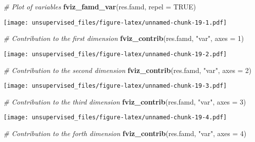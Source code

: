 \documentclass[
]{article}
\newenvironment{Shaded}{\begin{snugshade}}{\end{snugshade}}
\newcommand{\CommentTok}[1]{\textcolor[rgb]{0.56,0.35,0.01}{\textit{#1}}}
\newcommand{\DataTypeTok}[1]{\textcolor[rgb]{0.13,0.29,0.53}{#1}}
\newcommand{\DecValTok}[1]{\textcolor[rgb]{0.00,0.00,0.81}{#1}}
\newcommand{\KeywordTok}[1]{\textcolor[rgb]{0.13,0.29,0.53}{\textbf{#1}}}
\newcommand{\NormalTok}[1]{#1}
\newcommand{\OtherTok}[1]{\textcolor[rgb]{0.56,0.35,0.01}{#1}}
\newcommand{\StringTok}[1]{\textcolor[rgb]{0.31,0.60,0.02}{#1}}
\begin{document}
\begin{Shaded}
\begin{Highlighting}[]
\CommentTok{# Plot of variables}
\KeywordTok{fviz_famd_var}\NormalTok{(res.famd, }\DataTypeTok{repel =} \OtherTok{TRUE}\NormalTok{)}
\end{Highlighting}
\end{Shaded}

\texttt{[image: unsupervised\_files/figure-latex/unnamed-chunk-19-1.pdf]}

\begin{Shaded}
\begin{Highlighting}[]
\CommentTok{# Contribution to the first dimension}
\KeywordTok{fviz_contrib}\NormalTok{(res.famd, }\StringTok{"var"}\NormalTok{, }\DataTypeTok{axes =} \DecValTok{1}\NormalTok{)}
\end{Highlighting}
\end{Shaded}

\texttt{[image: unsupervised\_files/figure-latex/unnamed-chunk-19-2.pdf]}

\begin{Shaded}
\begin{Highlighting}[]
\CommentTok{# Contribution to the second dimension}
\KeywordTok{fviz_contrib}\NormalTok{(res.famd, }\StringTok{"var"}\NormalTok{, }\DataTypeTok{axes =} \DecValTok{2}\NormalTok{)}
\end{Highlighting}
\end{Shaded}

\texttt{[image: unsupervised\_files/figure-latex/unnamed-chunk-19-3.pdf]}

\begin{Shaded}
\begin{Highlighting}[]
\CommentTok{# Contribution to the third dimension}
\KeywordTok{fviz_contrib}\NormalTok{(res.famd, }\StringTok{"var"}\NormalTok{, }\DataTypeTok{axes =} \DecValTok{3}\NormalTok{)}
\end{Highlighting}
\end{Shaded}

\texttt{[image: unsupervised\_files/figure-latex/unnamed-chunk-19-4.pdf]}

\begin{Shaded}
\begin{Highlighting}[]
\CommentTok{# Contribution to the forth dimension}
\KeywordTok{fviz_contrib}\NormalTok{(res.famd, }\StringTok{"var"}\NormalTok{, }\DataTypeTok{axes =} \DecValTok{4}\NormalTok{)}
\end{Highlighting}
\end{Shaded}
\end{document}
